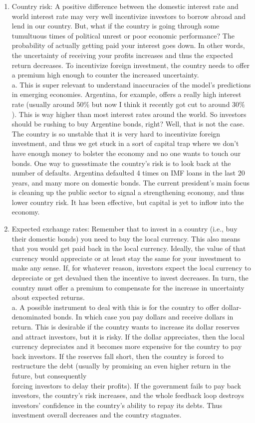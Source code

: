 \documentclass[10pt]{article}
\begin{document}
\begin{enumerate}
  \item Country risk: A positive difference between the domestic interest rate and world interest rate may very well incentivize investors to borrow abroad and lend in our country. But, what if the country is going through some tumultuous times of political unrest or poor economic performance? The probability of actually getting paid your interest goes down. In other words, the uncertainty of receiving your profits increases and thus the expected return decreases. To incentivize foreign investment, the country needs to offer a premium high enough to counter the increased uncertainty.\\
a. This is super relevant to understand inaccuracies of the model's predictions in emerging economies. Argentina, for example, offers a really high interest rate (usually around $50 \%$ but now I think it recently got cut to around $30 \%$ ). This is way higher than most interest rates around the world. So investors should be rushing to buy Argentine bonds, right? Well, that is not the case. The country is so unstable that it is very hard to incentivize foreign investment, and thus we get stuck in a sort of capital trap where we don't have enough money to bolster the economy and no one wants to touch our bonds. One way to guesstimate the country's risk is to look back at the number of defaults. Argentina defaulted 4 times on IMF loans in the last 20 years, and many more on domestic bonds. The current president's main focus is cleaning up the public sector to signal a strengthening economy, and thus lower country risk. It has been effective, but capital is yet to inflow into the economy.
  \item Expected exchange rates: Remember that to invest in a country (i.e., buy their domestic bonds) you need to buy the local currency. This also means that you would get paid back in the local currency. Ideally, the value of that currency would appreciate or at least stay the same for your investment to make any sense. If, for whatever reason, investors expect the local currency to depreciate or get devalued then the incentive to invest decreases. In turn, the country must offer a premium to compensate for the increase in uncertainty about expected returns.\\
a. A possible instrument to deal with this is for the country to offer dollar-denominated bonds. In which case you pay dollars and receive dollars in return. This is desirable if the country wants to increase its dollar reserves and attract investors, but it is risky. If the dollar appreciates, then the local currency depreciates and it becomes more expensive for the country to pay back investors. If the reserves fall short, then the country is forced to restructure the debt (usually by promising an even higher return in the future, but consequently\\
forcing investors to delay their profits). If the government fails to pay back investors, the country's risk increases, and the whole feedback loop destroys investors' confidence in the country's ability to repay its debts. Thus investment overall decreases and the country stagnates.
\end{enumerate}
\end{document}
